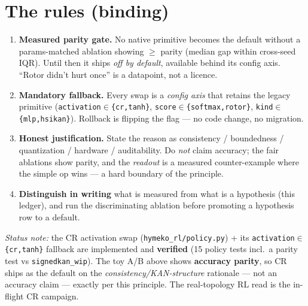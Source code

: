 \documentclass[11pt]{article}
\newcommand{\code}[1]{\texttt{\small #1}}
\begin{document}
\section*{The rules (binding)}
\begin{enumerate}[nosep, leftmargin=1.5em]
  \item \textbf{Measured parity gate.} No native primitive becomes the default without a params-matched
        ablation showing $\ge$ parity (median gap within cross-seed IQR). Until then it ships \emph{off by
        default}, available behind its config axis. ``Rotor didn't hurt once'' is a datapoint, not a licence.
  \item \textbf{Mandatory fallback.} Every swap is a \emph{config axis} that retains the legacy primitive
        (\code{activation$\in$\{cr,tanh\}}, \code{score$\in$\{softmax,rotor\}}, \code{kind$\in$\{mlp,hsikan\}}).
        Rollback is flipping the flag --- no code change, no migration.
  \item \textbf{Honest justification.} State the reason as consistency / boundedness / quantization / hardware /
        auditability. Do \emph{not} claim accuracy; the fair ablations show parity, and the \emph{readout} is a
        measured counter-example where the simple op wins --- a hard boundary of the principle.
  \item \textbf{Distinguish in writing} what is measured from what is a hypothesis (this ledger), and run the
        discriminating ablation before promoting a hypothesis row to a default.
\end{enumerate}

\noindent\textit{Status note:} the CR activation swap (\code{hymeko\_rl/policy.py}) + its
\code{activation$\in$\{cr,tanh\}} fallback are implemented and \textbf{verified} (15 policy tests incl.\ a
parity test vs \code{signedkan\_wip}). The toy A/B above shows \textbf{accuracy parity}, so CR ships as the
default on the \emph{consistency/KAN-structure} rationale --- not an accuracy claim --- exactly per this
principle. The real-topology RL read is the in-flight CR campaign.
\end{document}
